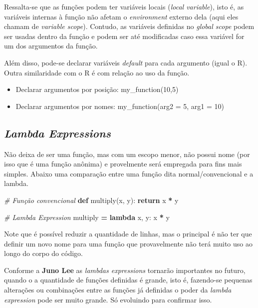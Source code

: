 \documentclass[]{book}
\newenvironment{Shaded}{\begin{snugshade}}{\end{snugshade}}
\newcommand{\KeywordTok}[1]{\textcolor[rgb]{0.13,0.29,0.53}{\textbf{#1}}}
\newcommand{\CommentTok}[1]{\textcolor[rgb]{0.56,0.35,0.01}{\textit{#1}}}
\newcommand{\ControlFlowTok}[1]{\textcolor[rgb]{0.13,0.29,0.53}{\textbf{#1}}}
\newcommand{\OperatorTok}[1]{\textcolor[rgb]{0.81,0.36,0.00}{\textbf{#1}}}
\newcommand{\NormalTok}[1]{#1}
\providecommand{\tightlist}{%
  \setlength{\itemsep}{0pt}\setlength{\parskip}{0pt}}
\begin{document}
Ressalta-se que as funções podem ter variáveis locais (\emph{local
variable}), isto é, as variáveis internas à função não afetam o
\emph{environment} externo dela (aqui eles chamam de \emph{variable
scope}). Contudo, as variáveis definidas no \emph{global scope} podem
ser usadas dentro da função e podem ser até modificadas caso essa
variável for um dos argumentos da função.

Além disso, pode-se declarar variáveis \emph{default} para cada
argumento (igual o R). Outra similaridade com o R é com relação ao uso
da função.

\begin{itemize}
\tightlist
\item
  Declarar argumentos por posição: my\_function(10,5)
\item
  Declarar argumentos por nomes: my\_function(arg2 = 5, arg1 = 10)
\end{itemize}

\subsection{\texorpdfstring{\emph{Lambda
Expressions}}{Lambda Expressions}}\label{lambda-expressions}

Não deixa de ser uma função, mas com um escopo menor, não possui nome
(por isso que é uma função anônima) e provelmente será empregada para
fins mais simples. Abaixo uma comparação entre uma função dita
normal/convencional e a lambda.

\begin{Shaded}
\begin{Highlighting}[]
\CommentTok{# Função convencional}
\KeywordTok{def}\NormalTok{ multiply(x, y):}
    \ControlFlowTok{return}\NormalTok{ x }\OperatorTok{*}\NormalTok{ y}

\CommentTok{# Lambda Expression}
\NormalTok{multiply }\OperatorTok{=} \KeywordTok{lambda}\NormalTok{ x, y: x }\OperatorTok{*}\NormalTok{ y}
\end{Highlighting}
\end{Shaded}

Note que é possível reduzir a quantidade de linhas, mas o principal é
não ter que definir um novo nome para uma função que provavelmente não
terá muito uso ao longo do corpo do código.

Conforme a \textbf{Juno Lee} as \emph{lambdas expressions} tornarão
importantes no futuro, quando o a quantidade de funções definidas é
grande, isto é, fazendo-se pequenas alterações ou combinações entre as
funções já definidas o poder da \emph{lambda expression} pode ser muito
grande. Só evoluindo para confirmar isso.
\end{document}

